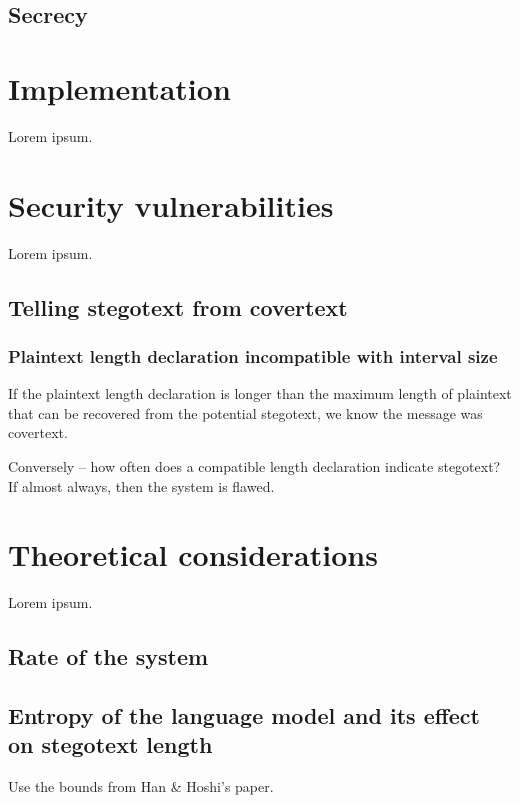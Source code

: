 \documentclass{IIBproject}
\begin{document}
\subsection{Secrecy}

\newpage
\section{Implementation}

Lorem ipsum.

\newpage
\section{Security vulnerabilities}

Lorem ipsum.

\subsection{Telling stegotext from covertext}

\subsubsection{Plaintext length declaration incompatible with interval size}

If the plaintext length declaration is longer than the maximum length of plaintext that can be recovered from the potential stegotext, we know the message was covertext.

Conversely -- how often does a compatible length declaration indicate stegotext? If almost always, then the system is flawed.

\newpage
\section{Theoretical considerations}

Lorem ipsum.

\subsection{Rate of the system}

\subsection{Entropy of the language model and its effect on stegotext length}

Use the bounds from Han \& Hoshi's paper.
\end{document}
